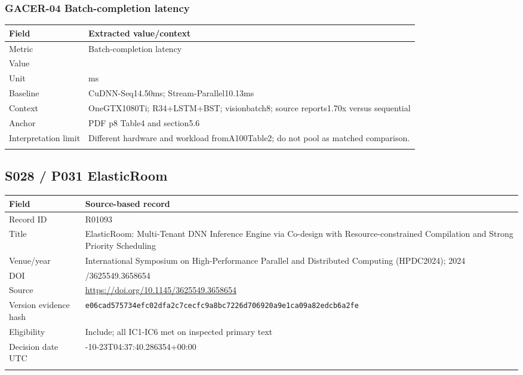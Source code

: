 \subsubsection*{GACER-04 Batch-completion latency}
\begin{longtable}{>{\raggedright\arraybackslash}p{}>{\raggedright\arraybackslash}p{}}
\toprule
\textbf{Field} & \textbf{Extracted value/context}\\\midrule\endhead
Metric & Batch-completion latency\\\addlinespace
Value & 8.51\\\addlinespace
Unit & ms\\\addlinespace
Baseline & CuDNN-Seq14.50ms;\allowbreak{} Stream-Parallel10.13ms\\\addlinespace
Context & OneGTX1080Ti;\allowbreak{} R34+LSTM+BST;\allowbreak{} visionbatch8;\allowbreak{} source reports1.70x versus sequential\\\addlinespace
Anchor & PDF p8 Table4 and section5.6\\\addlinespace
Interpretation limit & Different hardware and workload fromA100Table2;\allowbreak{} do not pool as matched comparison.\\\addlinespace
\bottomrule\end{longtable}
\clearpage\subsection{S028 / P031 ElasticRoom}
\cite{s028}
\begin{longtable}{>{\raggedright\arraybackslash}p{}>{\raggedright\arraybackslash}p{}}
\toprule
\textbf{Field} & \textbf{Source-based record}\\\midrule\endhead
Record ID & R01093\\\addlinespace
Title & ElasticRoom: Multi-Tenant DNN Inference Engine via Co-design with Resource-constrained Compilation and Strong Priority Scheduling\\\addlinespace
Venue/year & International Symposium on High-Performance Parallel and Distributed Computing (HPDC2024);\allowbreak{} 2024\\\addlinespace
DOI & 10.1145/3625549.3658654\\\addlinespace
Source & \url{https://doi.org/10.1145/3625549.3658654}\\\addlinespace
Version evidence hash & \nolinkurl{e06cad575734efc02dfa2c7cecfc9a8bc7226d706920a9e1ca09a82edcb6a2fe}\\\addlinespace
Eligibility & Include;\allowbreak{} all IC1-IC6 met on inspected primary text\\\addlinespace
Decision date UTC & 2026-10-23T04:37:40.286354+00:00\\\addlinespace
\bottomrule\end{longtable}
